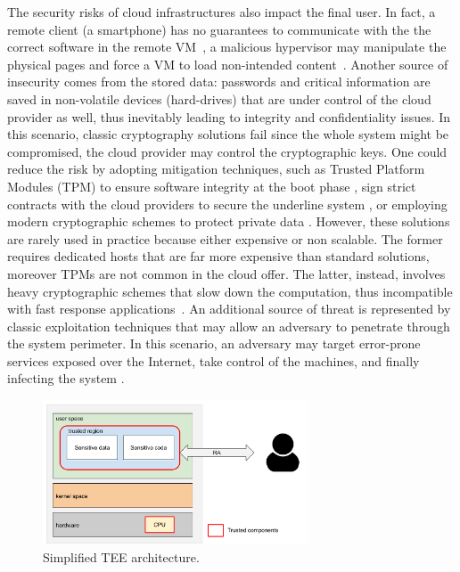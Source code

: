 The security risks of cloud infrastructures also impact the final 
user. In fact, a remote client (\eg a smartphone) has no guarantees to 
communicate with the the correct software in the remote 
VM~\citep{beekman2016attestation}, \eg a malicious hypervisor may manipulate 
the physical pages and force a VM to load non-intended 
content~\citep{10.1145/3292006.3300022}.
Another source of insecurity comes from the stored data: passwords and critical 
information are saved in non-volatile devices (\ie hard-drives) that are under 
control of the cloud provider as well, thus inevitably leading to integrity and 
confidentiality issues.
In this scenario, classic cryptography solutions fail since the whole system 
might be compromised, \ie the cloud provider may control the cryptographic keys.
%
One could reduce the risk by adopting mitigation techniques, such as 
Trusted Platform Modules (TPM) to ensure software integrity at the boot phase 
\citep{tpm-isoosi}, sign strict contracts with the cloud providers to secure 
the underline system \citep{aws_dedicated_host}, or employing modern 
cryptographic schemes to protect private data \citep{gentry2009fully}.
%
However, these solutions are rarely used in practice because either expensive 
or non scalable. The former requires dedicated hosts that are far more 
expensive than standard solutions, moreover TPMs are not common in the cloud 
offer. 
The latter, instead, involves heavy cryptographic schemes that slow down the 
computation, thus incompatible with fast response 
applications~\citep{10.1145/2046660.2046682}.
%
An additional source of threat is represented by classic exploitation 
techniques that may allow an adversary to penetrate through the system 
perimeter.
In this scenario, an adversary may target error-prone services exposed over the 
Internet, take control of the machines, and finally infecting the system 
\citep{van2012memory,10.1145/2810103.2813646}.


\begin{figure}[t]
	\centering
	\includegraphics[width=0.7\textwidth]{fig_c1/sgx-architecture.pdf}
	\caption[SGX architecture.]{Simplified TEE architecture.}
	\label{fig:sgx-architecture}
\end{figure}


